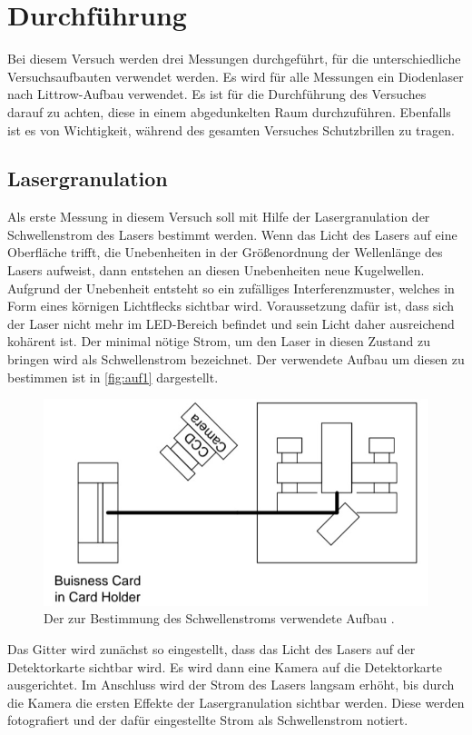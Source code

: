 \section{Durchführung}
\label{sec:Durchführung}

Bei diesem Versuch werden drei Messungen durchgeführt, für die unterschiedliche Versuchsaufbauten verwendet werden. Es wird für alle Messungen ein Diodenlaser
nach Littrow-Aufbau verwendet. Es ist für die Durchführung des Versuches darauf zu achten, diese in einem abgedunkelten Raum durchzuführen. Ebenfalls ist es von
Wichtigkeit, während des gesamten Versuches Schutzbrillen zu tragen.


\subsection{Lasergranulation}

Als erste Messung in diesem Versuch soll mit Hilfe der Lasergranulation der Schwellenstrom des Lasers bestimmt werden. Wenn das Licht des Lasers auf eine Oberfläche
trifft, die Unebenheiten in der Größenordnung der Wellenlänge des Lasers aufweist, dann entstehen an diesen Unebenheiten neue Kugelwellen. Aufgrund der Unebenheit entsteht so
ein zufälliges Interferenzmuster, welches in Form eines körnigen Lichtflecks sichtbar wird. Voraussetzung dafür ist, dass sich der Laser nicht mehr im LED-Bereich befindet und
sein Licht daher ausreichend kohärent ist. Der minimal nötige Strom, um den Laser in diesen Zustand zu bringen wird als Schwellenstrom bezeichnet. Der verwendete Aufbau um diesen
zu bestimmen ist in \autoref{fig:auf1} dargestellt.

\begin{figure}[H]
    \centering
    \includegraphics[width=\textwidth]{data/aufbau1.jpg}
    \caption{Der zur Bestimmung des Schwellenstroms verwendete Aufbau \cite{Anleitung60}.}
    \label{fig:auf1}
\end{figure}
\noindent
Das Gitter wird zunächst so eingestellt, dass das Licht des Lasers auf der Detektorkarte sichtbar wird. Es wird dann eine Kamera auf die Detektorkarte ausgerichtet. Im Anschluss
wird der Strom des Lasers langsam erhöht, bis durch die Kamera die ersten Effekte der Lasergranulation sichtbar werden. Diese werden fotografiert und der dafür eingestellte Strom
als Schwellenstrom notiert.


